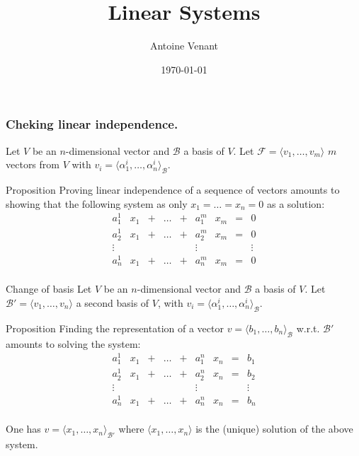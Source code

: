 \documentclass{beamer}
\begin{document}
\title{Linear Systems} 
\author{Antoine Venant}
\date{\today}
\maketitle

\begin{frame}
  \frametitle{Cheking linear independence.}
  Let $V$ be an $n$-dimensional vector and $\mathcal{B}$ a basis of $V$. Let $\mathcal{F} = \langle v_1, \dots, v_m \rangle$ $m$ vectors from $V$ with $v_i = \langle \alpha^i_1, \dots, \alpha^i_n \rangle_{\mathcal{B}}$.
  \begin{block}{Proposition}
    Proving linear independence of a sequence of vectors amounts to showing that the following system as only $x_1 = \dots = x_n = 0$ as a solution:
    \[ \begin{array}{ccccccccc}
      a^1_1 & x_1 & + & \dots & + & a^m_1 & x_m & = & 0 \\
      a^1_2 & x_1 & + & \dots & + & a^m_2 & x_m & = & 0\\
      \vdots&     &   &      &  &\vdots&     &   & \vdots\\
      a^1_n & x_1 & + & \dots & + &  a^m_n & x_m & = & 0\\
    \end{array}
    \]
    
  \end{block}
\end{frame}

\begin{frame}{Change of basis}
  Let $V$ be an $n$-dimensional vector and $\mathcal{B}$ a basis of $V$. Let $\mathcal{B}' = \langle v_1, \dots, v_n \rangle$ a second basis of $V$, with $v_i = \langle \alpha^i_1, \dots, \alpha^i_n \rangle_{\mathcal{B}}$.

  \begin{block}{Proposition}
  Finding the representation of a vector $v = \langle b_1, \dots, b_n \rangle_{\mathcal{B}}$ w.r.t. $\mathcal{B}'$ amounts to solving the system:
  \[
  \begin{array}{ccccccccc}
    a^1_1 & x_1 & + & \dots & + & a^n_1 & x_n & = & b_1 \\
    a^1_2 & x_1 & + & \dots & + & a^n_2 & x_n & = & b_2\\
    \vdots&     &   &      &  &\vdots&     &   & \vdots\\
    a^1_n & x_1 & + & \dots & + &  a^n_n & x_n & = & b_n\\
  \end{array}
  \]

  One has $v = \langle x_1, \dots, x_n \rangle_{\mathcal{B}'}$ where $\langle x_1, \dots, x_n \rangle$ is the (unique) solution of the above system.
  \end{block}
  
\end{frame}
\end{document}
